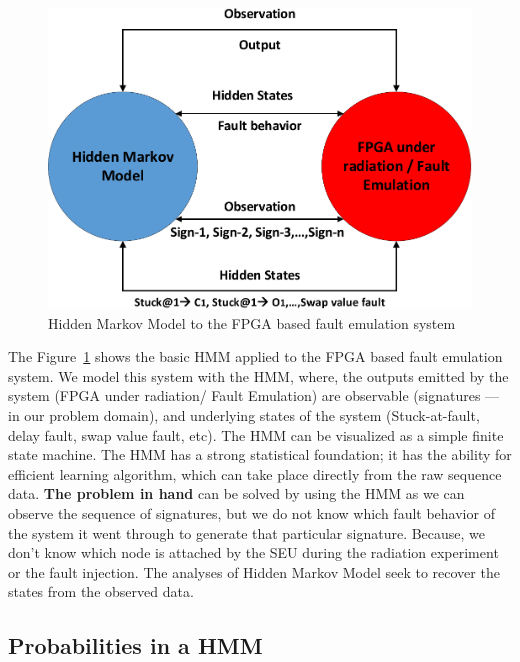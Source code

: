 \begin{figure}[tb!]

 \centering
  \captionsetup{justification=centering}    
   \includegraphics[scale=0.8]{Figures/HMM-air.pdf}
   \caption{Hidden Markov Model to the FPGA based fault emulation system}
\label{fig:HMM-air}
\end{figure}


The Figure~\ref{fig:HMM-air} shows the basic HMM applied to the FPGA based fault emulation system. We model this system with the HMM, where, the outputs emitted by the system (FPGA under radiation/ Fault Emulation) are observable (signatures --- in our problem domain), and underlying states of the system (Stuck-at-fault, delay fault, swap value fault, etc). The HMM can be visualized as a simple finite state machine. The HMM has a strong statistical foundation; it has the ability for efficient learning algorithm, which can take place directly from the raw sequence data. \textbf{The problem in hand} can be solved by using the HMM as we can observe the sequence of signatures, but we do not know  which fault behavior  of the system it went through to generate that particular signature. Because, we don't know which node is attached by the SEU during the radiation experiment or the fault injection. The analyses of Hidden Markov Model seek to recover the states from the observed data.








\subsection{Probabilities in a HMM}

